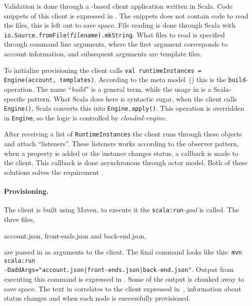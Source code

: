 Validation is done through a -based client application written in Scala.
Code snippets of this client is expressed in .
The snippets does not contain code to read the files, this is left out to save space.
File reading is done through Scala with \texttt{io.Source.fromFile(\emph{filename}).mkString}.
What files to read is specified through command line arguments,
where the first argument corresponds to account information,
and subsequent arguments are template files.

To initialize provisioning the client calls 
\texttt{val runtimeInstances = Engine(account, templates)}.
According to the meta model~() this is the \texttt{build}-operation.
The name ``\emph{build}'' is a general term, while the usage in 
is a Scala-specific pattern.
What Scala does here is syntactic sugar, when the client calls \texttt{Engine()},
Scala converts this into \texttt{Engine.apply()}.
This operation is overridden in \texttt{Engine}, so the logic is controlled by \emph{cloudml-engine}.

After receiving a list of \texttt{RuntimeInstances} the client runs through these 
objects and attach ``listeners''.
These listeners works according to the observer pattern,
when a property is added or the instance changes status,
a callback is made to the client.
This callback is done asynchronous through actor model.
Both of these solutions solves the requirement .

\paragraph{Provisioning.}


The client is built using Maven, to execute it the \texttt{scala:run}-\emph{goal} is called.
The three files,
\begin{ii}
  \iitem account.json,
  \iitem front-ends.json and
  \iitem back-end.json,
\end{ii}
are passed in as arguments to the client.
The final command looks like this:
\texttt{mvn scala:run \\ -DaddArgs="account.json|front-ends.json|back-end.json"}.
Output from executing this command is expressed in .
Some of the output is chunked away to save space.
The text in  correlates to the 
client expressed in~,
\ie information about status changes and when each node is successfully provisioned.

